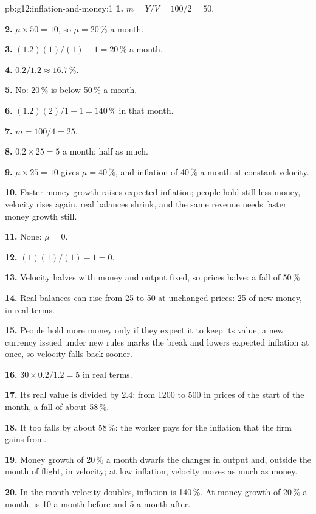 \begin{solution}{pb:g12:inflation-and-money:1}
\textbf{1.} $m = Y/V = 100/2 = 50$.

\textbf{2.} $\mu \times 50 = 10$, so $\mu = 20\,\%$ a month.

\textbf{3.} $(1.2)(1)/(1) - 1 = 20\,\%$ a month.

\textbf{4.} $0.2/1.2 \approx 16.7\,\%$.

\textbf{5.} No: 20\,\% is below 50\,\% a month.

\textbf{6.} $(1.2)(2)/1 - 1 = 140\,\%$ in that month.

\textbf{7.} $m = 100/4 = 25$.

\textbf{8.} $0.2 \times 25 = 5$ a month: half as much.

\textbf{9.} $\mu \times 25 = 10$ gives $\mu = 40\,\%$, and inflation of 40\,\% a month at constant velocity.

\textbf{10.} Faster money growth raises expected inflation; people hold still less money, velocity rises again, real balances shrink, and the same revenue needs faster
money growth still.

\textbf{11.} None: $\mu = 0$.

\textbf{12.} $(1)(1)/(1) - 1 = 0$.

\textbf{13.} Velocity halves with money and output fixed, so prices halve: a fall of 50\,\%.

\textbf{14.} Real balances can rise from 25 to 50 at unchanged prices: 25 of new money, in real terms.

\textbf{15.} People hold more money only if they expect it to keep its value; a new currency issued under new rules marks the break and lowers expected inflation at once,
so velocity falls back sooner.

\textbf{16.} $30 \times 0.2/1.2 = 5$ in real terms.

\textbf{17.} Its real value is divided by 2.4: from 1200 to 500 in prices of the start of the month, a fall of about 58\,\%.

\textbf{18.} It too falls by about 58\,\%: the worker pays for the inflation that the firm gains from.

\textbf{19.} Money growth of 20\,\% a month dwarfs the changes in output and, outside the month of flight, in velocity; at low inflation, velocity moves as much as money.

\textbf{20.} In the month velocity doubles, inflation is 140\,\%. At money growth of 20\,\% a month,  is 10 a month before and 5 a month after.
\end{solution}
